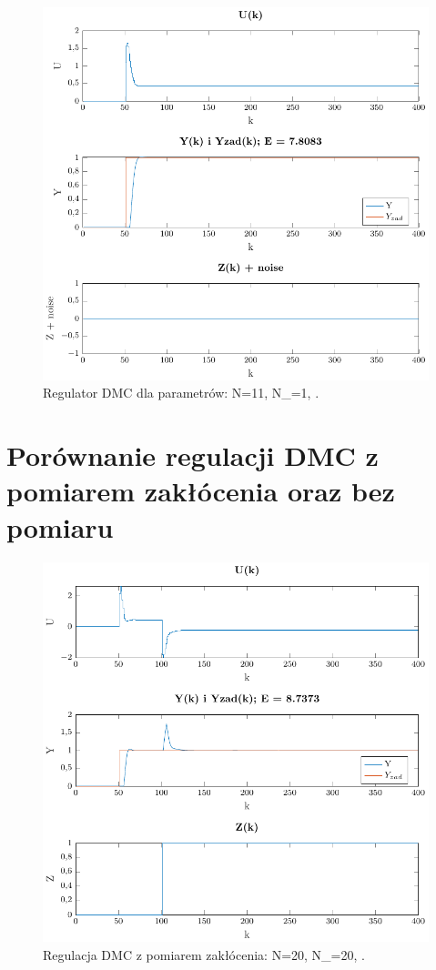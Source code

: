 \documentclass[a4paper,titlepage,11pt,twosides,floatssmall]{mwrep}
\begin{document}
\begin{figure}[H]
	\centering
	\includegraphics[scale=0.85]{../../Lab2/PDF_rysunki/Z4_DMCParametryN_11_Nu_1_lam_1.pdf}
	\caption{Regulator DMC dla parametrów: N=11, N_{}=1, .}
	\label{dobor_param1}
\end{figure}


\section{Porównanie regulacji DMC z pomiarem zakłócenia oraz bez pomiaru}



\begin{figure}[H]
	\centering
	\includegraphics[scale=0.85]{../../Lab2/PDF_rysunki/Z5_DMCZZakloceniami.pdf}
	\caption{Regulacja DMC z pomiarem zakłócenia: N=20, N_{}=20, .}
	\label{pom_zak}
\end{figure}
\end{document}
